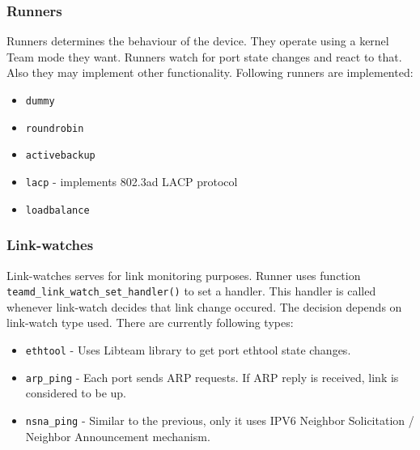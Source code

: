 \documentclass[11pt,a4paper]{article}
\begin{document}
\subsubsection{Runners}

Runners determines the behaviour of the device. They operate using a kernel Team mode they want. Runners watch for port state changes and react to that. Also they may implement other functionality. Following runners are implemented:

\begin{itemize}
\item \verb+dummy+ 
\item \verb+roundrobin+ 
\item \verb+activebackup+
\item \verb+lacp+ - implements 802.3ad LACP protocol
\item \verb+loadbalance+
\end{itemize}

\subsubsection{Link-watches}

Link-watches serves for link monitoring purposes. Runner uses function \verb+teamd_link_watch_set_handler()+ to set a handler. This handler is called whenever link-watch decides that link change occured. The decision depends on link-watch type used. There are currently following types:

\begin{itemize}
\item \verb+ethtool+ - Uses Libteam library to get port ethtool state changes. 
\item \verb+arp_ping+ - Each port sends ARP requests. If ARP reply is received, link is considered to be up.
\item \verb+nsna_ping+ - Similar to the previous, only it uses IPV6 Neighbor Solicitation / Neighbor Announcement mechanism.
\end{itemize}
\end{document}
